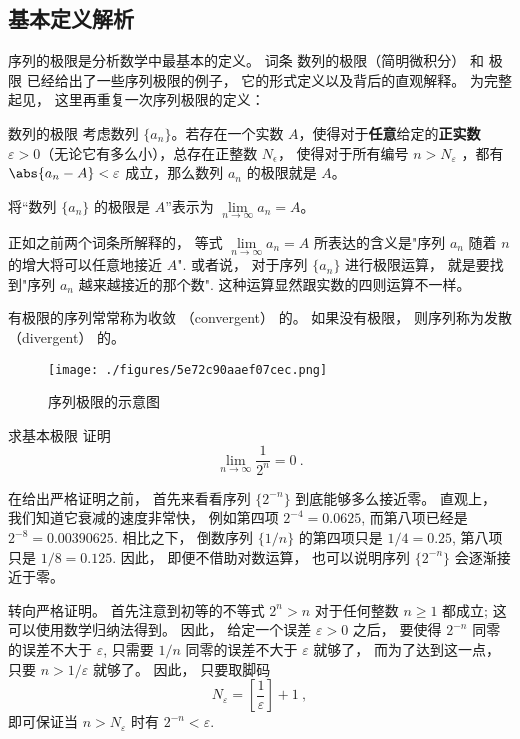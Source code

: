 
\begin{issues}
\end{issues}


\subsection{基本定义解析}

序列的极限是分析数学中最基本的定义。 词条 数列的极限（简明微积分） 和 极限 已经给出了一些序列极限的例子， 它的形式定义以及背后的直观解释。 为完整起见， 这里再重复一次序列极限的定义：

\begin{definition}{数列的极限}
考虑数列 $\{a_n\}$。若存在一个实数 $A$，使得对于\textbf{任意}给定的\textbf{正实数} $\varepsilon > 0$（无论它有多么小），总存在正整数 $N_\epsilon$， 使得对于所有编号 $n>N_\varepsilon$ ，都有 $\abs{a_n - A} < \varepsilon$ 成立，那么数列 $a_n$ 的极限就是 $A$。

将“数列 $\{a_n\}$ 的极限是 $A$”表示为 $\lim\limits_{n\to\infty}a_n=A$。
\end{definition}

正如之前两个词条所解释的， 等式 $\lim\limits_{n\to\infty}a_n=A$ 所表达的含义是"序列 $a_n$ 随着 $n$ 的增大将可以任意地接近 $A$". 或者说， 对于序列 $\{a_n\}$ 进行极限运算， 就是要找到"序列 $a_n$ 越来越接近的那个数". 这种运算显然跟实数的四则运算不一样。

有极限的序列常常称为收敛 （convergent） 的。 如果没有极限， 则序列称为发散 （divergent） 的。
\begin{figure}[ht]
\centering
\texttt{[image: ./figures/5e72c90aaef07cec.png]}
\caption{序列极限的示意图} \label{fig_SeqLim_1}
\end{figure}
\begin{example}{求基本极限}
证明$$\lim\limits_{n\to\infty}\frac{1}{2^n}=0~.$$

在给出严格证明之前， 首先来看看序列 $\{2^{-n}\}$ 到底能够多么接近零。 直观上， 我们知道它衰减的速度非常快， 例如第四项 $2^{-4}=0.0625$, 而第八项已经是 $2^{-8}=0.00390625$. 相比之下， 倒数序列 $\{1/n\}$ 的第四项只是 $1/4=0.25$, 第八项只是 $1/8=0.125$. 因此， 即便不借助对数运算， 也可以说明序列 $\{2^{-n}\}$ 会逐渐接近于零。

转向严格证明。 首先注意到初等的不等式 $2^n>n$ 对于任何整数 $n\geq1$ 都成立; 这可以使用数学归纳法得到。 因此， 给定一个误差 $\varepsilon>0$ 之后， 要使得 $2^{-n}$ 同零的误差不大于 $\varepsilon$, 只需要 $1/n$ 同零的误差不大于 $\varepsilon$ 就够了， 而为了达到这一点， 只要 $n>1/\varepsilon$ 就够了。 因此， 只要取脚码
$$
N_\varepsilon=\left[\frac{1}{\varepsilon}\right]+1~,
$$
即可保证当 $n>N_\varepsilon$ 时有 $2^{-n}<\varepsilon$.
\end{example}

